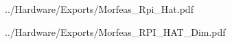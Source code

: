 \newpage

{../Hardware/Exports/Morfeas_Rpi_Hat.pdf}
\newpage

{../Hardware/Exports/Morfeas_RPI_HAT_Dim.pdf}
